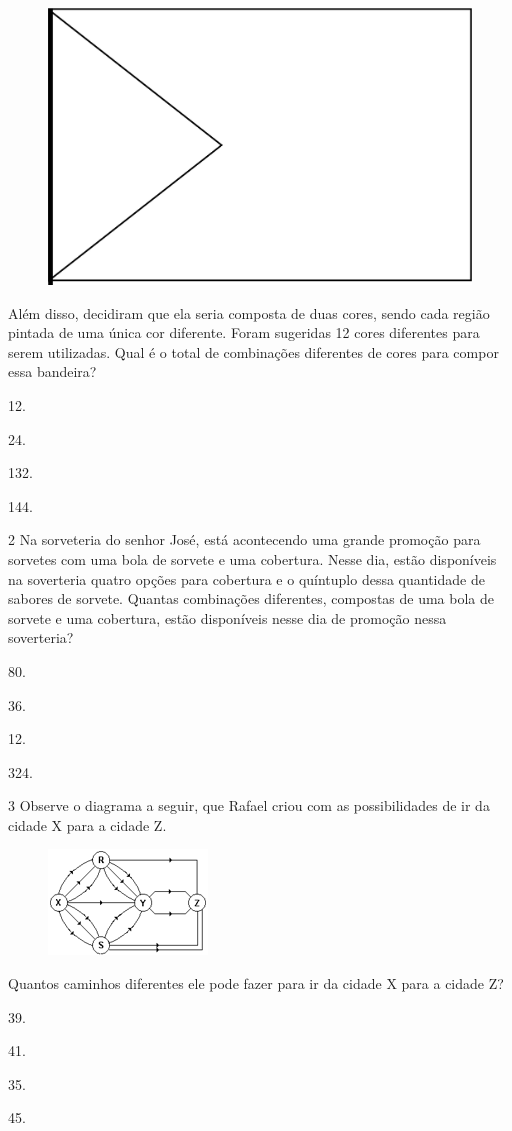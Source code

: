 \begin{figure}[htpb!]
\centering
\includegraphics[width=.2\textwidth]{media/image74.png}
\end{figure}

Além disso, decidiram que ela seria composta de duas cores, sendo cada
região pintada de uma única cor diferente. Foram sugeridas 12 cores
diferentes para serem utilizadas. Qual é o total de combinações
diferentes de cores para compor essa bandeira?

\begin{multicols}{2}
\begin{escolha}
\item
  12.
\item
  24.
\item
  132.
\item
  144.
\end{escolha}
\end{multicols}

\num{2} Na sorveteria do senhor José, está acontecendo uma grande promoção para
sorvetes com uma bola de sorvete e uma cobertura. Nesse dia, estão
disponíveis na soverteria quatro opções para cobertura e o quíntuplo dessa
quantidade de sabores de sorvete. Quantas combinações diferentes, compostas de uma bola de
sorvete e uma cobertura, estão disponíveis nesse dia de promoção nessa
soverteria?

\begin{multicols}{2}
\begin{escolha}
\item
  80.
\item
  36.
\item
  12.
\item
  324.
\end{escolha}
\end{multicols}

\num{3} Observe o diagrama a seguir, que Rafael criou com as possibilidades de ir
da cidade X para a cidade Z.

\begin{figure}[htpb!]
\centering
\includegraphics[width=.3\textwidth]{media/image75.png}
\end{figure}

Quantos caminhos diferentes ele pode fazer para ir da cidade X para a
cidade Z?

\begin{multicols}{2}
\begin{escolha}
\item
  39.
\item
  41.
\item
  35.
\item
  45.
\end{escolha}
\end{multicols}

